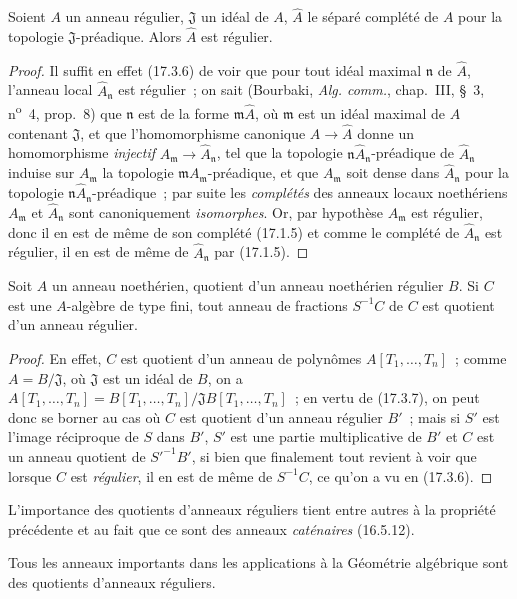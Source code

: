 \begin{lemma}[17.3.8.1]
\label{0.17.3.8.1-fr}
Soient $A$ un anneau régulier, $\mathfrak{J}$ un idéal de $A$,
$\widehat{A}$ le séparé complété de $A$ pour la topologie
$\mathfrak{J}$-préadique. Alors $\widehat{A}$ est régulier.
\end{lemma}

\begin{proof}
Il suffit en effet (17.3.6) de voir que pour tout idéal maximal
$\mathfrak{n}$ de $\widehat{A}$, l'anneau local
$\widehat{A}_{\mathfrak{n}}$ est régulier~; on sait (Bourbaki,
\emph{Alg. comm.}, chap.~III, \S~3, n\textsuperscript{o}~4, prop.~8) que
$\mathfrak{n}$
est de la forme $\mathfrak{m}\widehat{A}$, où $\mathfrak{m}$ est un idéal
maximal de $A$ contenant $\mathfrak{J}$, et que l'homomorphisme canonique
$A\to\widehat{A}$ donne un homomorphisme \emph{injectif}
$A_{\mathfrak{m}}\to\widehat{A}_{\mathfrak{n}}$, tel que la topologie
$\mathfrak{n}\widehat{A}_{\mathfrak{n}}$-préadique de
$\widehat{A}_{\mathfrak{n}}$ induise sur $A_{\mathfrak{m}}$ la topologie
$\mathfrak{m}A_{\mathfrak{m}}$-préadique, et que $A_{\mathfrak{m}}$ soit
dense dans $\widehat{A}_{\mathfrak{n}}$ pour la topologie
$\mathfrak{n}\widehat{A}_{\mathfrak{n}}$-préadique~; par suite les
\emph{complétés} des anneaux locaux noethériens $A_{\mathfrak{m}}$ et
$\widehat{A}_{\mathfrak{n}}$ sont canoniquement \emph{isomorphes}. Or, par
hypothèse $A_{\mathfrak{m}}$ est régulier, donc il en est de même de son
complété (17.1.5) et comme le complété de $\widehat{A}_{\mathfrak{n}}$ est
régulier, il en est de même de $\widehat{A}_{\mathfrak{n}}$ par (17.1.5).
\end{proof}

\begin{corollary}[17.3.9]
\label{0.17.3.9-fr}
Soit $A$ un anneau noethérien, quotient d'un anneau noethérien régulier $B$.
Si $C$ est une $A$-algèbre de type fini, tout anneau de fractions $S^{-1}C$
de $C$ est quotient d'un anneau régulier.
\end{corollary}

\begin{proof}
En effet, $C$ est quotient d'un anneau de polynômes $A[T_1,\ldots,T_n]$~;
comme $A=B/\mathfrak{J}$, où $\mathfrak{J}$ est un idéal de $B$, on a
$A[T_1,\ldots,T_n]=B[T_1,\ldots,T_n]/\mathfrak{J}B[T_1,\ldots,T_n]$~; en
vertu de (17.3.7), on peut donc se borner au cas où $C$ est quotient d'un
anneau régulier $B'$~; mais si $S'$ est l'image réciproque de $S$ dans $B'$,
$S'$ est une partie multiplicative de $B'$ et $C$ est un anneau quotient de
$S'^{-1}B'$, si bien que finalement tout revient à voir que lorsque $C$ est
\emph{régulier}, il en est de même de $S^{-1}C$, ce qu'on a vu en (17.3.6).
\end{proof}

L'importance des quotients d'anneaux réguliers tient entre autres à la
propriété précédente et au fait que ce sont des anneaux \emph{caténaires}
(16.5.12).

Tous les anneaux importants dans les applications à la Géométrie algébrique
sont des quotients d'anneaux réguliers.
